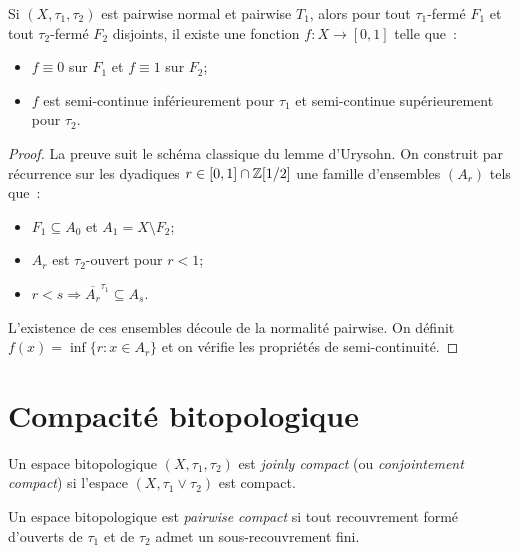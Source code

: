 \begin{theoreme}
Si $(X,\tau_1,\tau_2)$ est pairwise normal et pairwise $T_1$, alors pour tout
$\tau_1$-ferm\'e $F_1$ et tout $\tau_2$-ferm\'e $F_2$ disjoints, il existe une fonction
$f\colon X \to [0,1]$ telle que~:
\begin{itemize}
  \item $f \equiv 0$ sur $F_1$ et $f \equiv 1$ sur $F_2$;
  \item $f$ est semi-continue inf\'erieurement pour $\tau_1$ et semi-continue
    sup\'erieurement pour $\tau_2$.
\end{itemize}
\end{theoreme}

\begin{proof}
La preuve suit le sch\'ema classique du lemme d'Urysohn. On construit par r\'ecurrence
sur les dyadiques $r \in [0,1] \cap \mathbb{Z}[1/2]$ une famille d'ensembles $(A_r)$ tels que~:
\begin{itemize}
  \item $F_1 \subseteq A_0$ et $A_1 = X \setminus F_2$;
  \item $A_r$ est $\tau_2$-ouvert pour $r < 1$;
  \item $r < s \Rightarrow \overline{A_r}^{\tau_1} \subseteq A_s$.
\end{itemize}
L'existence de ces ensembles d\'ecoule de la normalit\'e pairwise. On d\'efinit
$f(x) = \inf\{r : x \in A_r\}$ et on v\'erifie les propri\'et\'es de semi-continuit\'e.
\end{proof}

\section{Compacit\'e bitopologique}

\begin{definition}
Un espace bitopologique $(X,\tau_1,\tau_2)$ est \emph{joinly compact} (ou
\emph{conjointement compact}) si l'espace $(X, \tau_1 \vee \tau_2)$ est compact.
\end{definition}

\begin{definition}
Un espace bitopologique est \emph{pairwise compact} si tout recouvrement form\'e d'ouverts
de $\tau_1$ et de $\tau_2$ admet un sous-recouvrement fini.
\end{definition}

